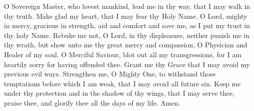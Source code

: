 O Sovereign Master, who lovest mankind, lead me in thy way, that I may walk in thy truth. Make glad my heart, that I may fear thy Holy Name. O Lord, mighty in mercy, gracious in strength, aid and comfort and save me, as I put my trust in thy holy Name. Rebuke me not, O Lord, in thy displeasure, neither punish me in thy wrath, but show unto me thy great mercy and compassion, O Physician and Healer of my soul. O Merciful Saviour, blot out all my transgressions, for I am heartily sorry for having offended thee. Grant me thy Grace that I may avoid my previous evil ways. Strengthen me, O Mighty One, to withstand those temptations before which I am weak, that I may avoid all future sin. Keep me under thy protection and in the shadow of thy wings, that I may serve thee, praise thee, and glorify thee all the days of my life. Amen.
